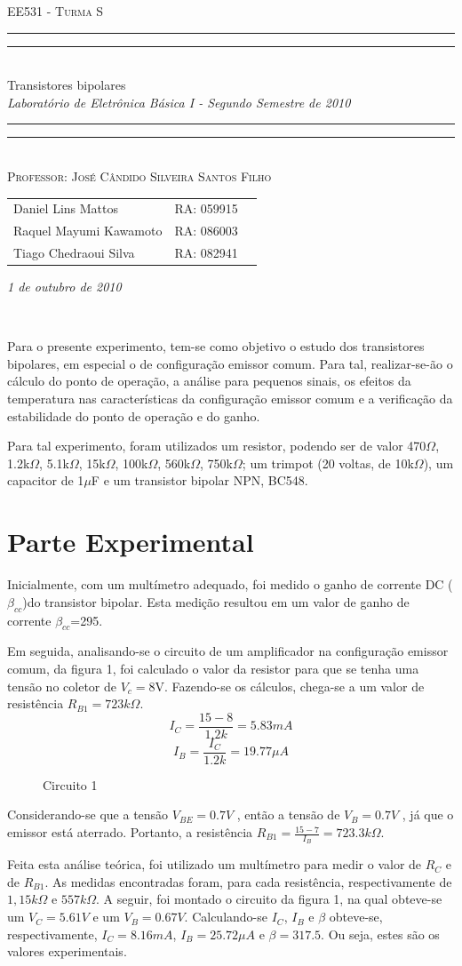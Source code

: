 \documentclass[a4paper]{article} %
\date{Outubro 1, 2010}
\newcommand*{\titleTMB}{\begingroup \centering \settowidth{\unitlength}{\LARGE EE531} {\large\scshape EE531 - Turma S}\\[0.2\baselineskip] \rule{11.0cm}{1.6pt}\vspace*{-\baselineskip}\vspace*{2pt} \rule{11.0cm}{0.4pt}\\[\baselineskip] {\LARGE Transistores bipolares}\\\vspace*{\baselineskip}  {\itshape Laboratório de Eletrônica Básica I - Segundo Semestre de 2010}\\ \rule{11.0cm}{0.4pt}\vspace*{-\baselineskip}\vspace{3.2pt} \rule{11.0cm}{1.6pt}\\[\baselineskip] {\large\scshape Professor: José Cândido Silveira Santos Filho}\par \vfill {\normalsize   \scshape 
    \begin{center} 
      \begin{tabular}{  l  l  p{5cm} } 
 	Daniel Lins Mattos & RA: 059915\\
        Raquel Mayumi Kawamoto & RA: 086003\\
        Tiago Chedraoui Silva  & RA: 082941\\
      \end{tabular} \end{center}
    \itshape 1 de outubro de 2010    }\\[\baselineskip] \vspace{3.2pt} \endgroup}
\begin{document}
\titleTMB 
\newpage

Para o presente experimento, tem-se como objetivo o estudo dos transistores bipolares, em
especial o de configuração emissor comum. Para tal, realizar-se-ão o cálculo do ponto de
operação, a análise para pequenos sinais, os efeitos da temperatura nas características da
configuração emissor comum e a verificação da estabilidade do ponto de operação e do
ganho.

Para tal experimento, foram utilizados um resistor, podendo ser de valor 470$\Omega$, 1.2k$\Omega$, 5.1k$\Omega$,
15k$\Omega$, 100k$\Omega$, 560k$\Omega$, 750k$\Omega$; um trimpot (20 voltas, de 10k$\Omega$), um capacitor de 1$\mu$F e um
transistor bipolar NPN, BC548.

\section*{Parte Experimental}

Inicialmente, com um multímetro adequado, foi medido o ganho de corrente DC
($\beta_{cc}$)do transistor bipolar. Esta medição resultou em um valor de ganho de corrente
$\beta_{cc}$=295.


Em seguida, analisando-se o circuito de um amplificador na configuração emissor
comum, da figura 1, foi calculado o valor da resistor
para que se tenha uma tensão no
coletor de $V_c=$8V. Fazendo-se os cálculos, chega-se a um valor de resistência
$R_{B1}=723k\Omega$.
\begin{displaymath}
I_C=\frac{15-8}{1.2k}=5.83mA
\end{displaymath}
\begin{displaymath}
I_B=\frac{I_C}{1.2k}=19.77\mu A
\end{displaymath}

\begin{figure}[h]
\centerline{}
\caption{Circuito 1\label{circ:1}}
\end{figure}


Considerando-se que a tensão $V_{BE}=0.7V$ 
, então a tensão de $V_{B}=0.7V$ , já que o
emissor está aterrado. Portanto, a resistência
$R_{B1}=\frac{15-7}{I_B}=723.3k\Omega$.


Feita esta análise teórica, foi utilizado um multímetro para medir o valor de $R_C$ e de $R_{B1}$. As medidas encontradas foram, para cada resistência, respectivamente de $1,15k\Omega$ e $557k\Omega$. A seguir, foi montado o circuito da figura 1, na qual obteve-se um $V_C=5.61V$ e um $V_B=0.67V$. Calculando-se $I_C$, $I_B$ e $\beta$ obteve-se, respectivamente, $I_C=8.16mA$, $I_B=25.72\mu A$ e $\beta=317.5$. Ou seja, estes são os valores experimentais.
\end{document}
